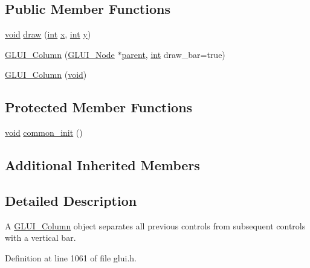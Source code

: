 \subsection*{Public Member Functions}
\begin{DoxyCompactItemize}
\item 
\hyperlink{wglext_8h_a9e6b7f1933461ef318bb000d6bd13b83}{void} \hyperlink{class_g_l_u_i___column_aefa72a27e5a6ba5e86f684b6a5b5f63e}{draw} (\hyperlink{wglext_8h_a500a82aecba06f4550f6849b8099ca21}{int} \hyperlink{glext_8h_ad77deca22f617d3f0e0eb786445689fc}{x}, \hyperlink{wglext_8h_a500a82aecba06f4550f6849b8099ca21}{int} \hyperlink{glext_8h_a9298c7ad619074f5285b32c6b72bfdea}{y})
\item 
\hyperlink{class_g_l_u_i___column_a309d2c36583fb571763c95d8ae3bbaa3}{G\+L\+U\+I\+\_\+\+Column} (\hyperlink{class_g_l_u_i___node}{G\+L\+U\+I\+\_\+\+Node} $\ast$\hyperlink{class_g_l_u_i___node_a8ed65d447784f6f88bd3e2e2bcac6cdb}{parent}, \hyperlink{wglext_8h_a500a82aecba06f4550f6849b8099ca21}{int} draw\+\_\+bar=true)
\item 
\hyperlink{class_g_l_u_i___column_a71c1f66b78ae12a93901a9ca53e504ea}{G\+L\+U\+I\+\_\+\+Column} (\hyperlink{wglext_8h_a9e6b7f1933461ef318bb000d6bd13b83}{void})
\end{DoxyCompactItemize}
\subsection*{Protected Member Functions}
\begin{DoxyCompactItemize}
\item 
\hyperlink{wglext_8h_a9e6b7f1933461ef318bb000d6bd13b83}{void} \hyperlink{class_g_l_u_i___column_af5aa315100428399f2a7920fb9eb53b7}{common\+\_\+init} ()
\end{DoxyCompactItemize}
\subsection*{Additional Inherited Members}


\subsection{Detailed Description}
A \hyperlink{class_g_l_u_i___column}{G\+L\+U\+I\+\_\+\+Column} object separates all previous controls from subsequent controls with a vertical bar. 

Definition at line 1061 of file glui.\+h.



